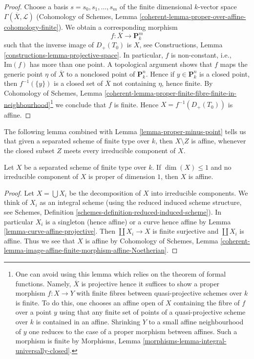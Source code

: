 \begin{proof}
\medskip\noindent
Choose a basis $s = s_0, s_1, \ldots, s_m$ of the finite dimensional
$k$-vector space $\Gamma(\overline{X}, \mathcal{L})$
(Cohomology of Schemes, Lemma
\ref{coherent-lemma-proper-over-affine-cohomology-finite}).
We obtain a corresponding morphism
$$
f : \overline{X} \longrightarrow \mathbf{P}^m_k
$$
such that the inverse image of $D_{+}(T_0)$ is $X$, see
Constructions, Lemma \ref{constructions-lemma-projective-space}.
In particular, $f$ is non-constant, i.e., $\text{Im}(f)$ has more
than one point. A topological argument shows that $f$ maps the generic
point $\eta$ of $\overline{X}$ to a nonclosed point of $\mathbf{P}^n_k$.
Hence if $y \in \mathbf{P}^n_k$ is a closed point, then $f^{-1}(\{y\})$
is a closed set of $\overline{X}$ not containing $\eta$, hence finite.
By Cohomology of Schemes, Lemma
\ref{coherent-lemma-proper-finite-fibre-finite-in-neighbourhood}\footnote{One
can avoid using this lemma which relies on the theorem of formal
functions. Namely, $\overline{X}$ is projective hence it suffices to show
a proper morphism $f : X \to Y$ with finite fibres between quasi-projective
schemes over $k$ is finite. To do this, one chooses an affine open of $X$
containing the fibre of $f$ over a point $y$ using that any finite set of
points of a quasi-projective scheme over $k$ is contained in an affine.
Shrinking $Y$ to a small affine neighbourhood of $y$ one reduces to the
case of a proper morphism between affines. Such a morphism is finite by
Morphisms, Lemma \ref{morphisms-lemma-integral-universally-closed}.}
we conclude that $f$ is finite. Hence $X = f^{-1}(D_{+}(T_0))$
is affine.
\end{proof}

\noindent
The following lemma combined with Lemma \ref{lemma-proper-minus-point}
tells us that given a separated scheme of finite type over $k$, then
$X \setminus Z$ is affine, whenever the closed subset $Z$ meets every
irreducible component of $X$.

\begin{lemma}
\label{lemma-dim-1-nonproper-affine}
Let $X$ be a separated scheme of finite type over $k$.
If $\dim(X) \leq 1$ and no irreducible component of $X$
is proper of dimension $1$, then $X$ is affine.
\end{lemma}

\begin{proof}
Let $X = \bigcup X_i$ be the decomposition of $X$ into irreducible components.
We think of $X_i$ as an integral scheme (using the reduced induced scheme
structure, see Schemes, Definition
\ref{schemes-definition-reduced-induced-scheme}).
In particular $X_i$ is a singleton (hence affine) or a curve
hence affine by Lemma \ref{lemma-curve-affine-projective}.
Then $\coprod X_i \to X$ is finite surjective and $\coprod X_i$ is affine.
Thus we see that $X$ is affine by
Cohomology of Schemes, Lemma
\ref{coherent-lemma-image-affine-finite-morphism-affine-Noetherian}.
\end{proof}



